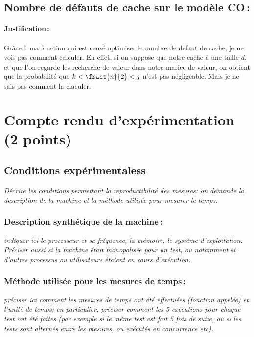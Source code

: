 \documentclass[a4paper, 10pt, french]{article}
\begin{document}
  \subsection{Nombre de défauts de cache sur le modèle CO\,: }
    \paragraph{Justification\,: }
    Grâce à ma fonction qui est censé optimiser le nombre de defaut de cache, je ne vois pas comment calculer.
    En effet, si on suppose que notre cache à une taille $d$, et que l'on regarde les recherche de valeur dans notre marice de valeur, 
    on obtient que la probabilité que $k<\fract{n}{2}<j$ n'est pas négligeable. Mais je ne sais pas comment la claculer.

\section{Compte rendu d'expérimentation (2 points)}
  \subsection{Conditions expérimentaless}
     {\em Décrire les conditions permettant la reproductibilité des mesures: on demande la description
      de la machine et la méthode utilisée pour mesurer le temps.
     }

    \subsubsection{Description synthétique de la machine\,:} 
      {\em indiquer ici le  processeur et sa fréquence, la mémoire, le système d'exploitation. 
       Préciser aussi si la machine était monopolisée pour un test, ou notamment si 
       d'autres processus ou utilisateurs étaient en cours d'exécution. 
      } 

    \subsubsection{Méthode utilisée pour les mesures de temps\,: } 
      {\em préciser ici  comment les mesures de temps ont été effectuées (fonction appelée) et l'unité de temps; en particulier, 
       préciser comment les 5 exécutions pour chaque test ont été faites (par exemple si le même test est fait 5 fois de suite, ou si les tests sont alternés entre
       les mesures, ou exécutés en concurrence etc). 
      }
\end{document}
